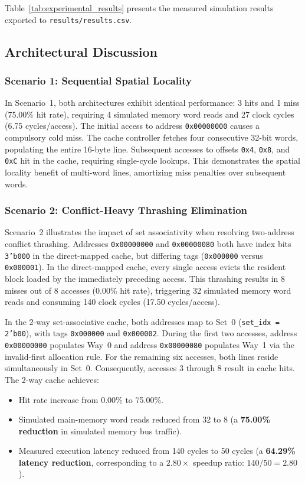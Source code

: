 \documentclass[conference]{IEEEtran}
\begin{document}
Table~\ref{tab:experimental_results} presents the measured simulation results exported to \texttt{results/results.csv}.

\subsection{Architectural Discussion}

\subsubsection{Scenario 1: Sequential Spatial Locality}
In Scenario~1, both architectures exhibit identical performance: 3 hits and 1 miss (75.00\% hit rate), requiring 4 simulated memory word reads and 27 clock cycles (6.75 cycles/access). The initial access to address \texttt{0x00000000} causes a compulsory cold miss. The cache controller fetches four consecutive 32-bit words, populating the entire 16-byte line. Subsequent accesses to offsets \texttt{0x4}, \texttt{0x8}, and \texttt{0xC} hit in the cache, requiring single-cycle lookups. This demonstrates the spatial locality benefit of multi-word lines, amortizing miss penalties over subsequent words.

\subsubsection{Scenario 2: Conflict-Heavy Thrashing Elimination}
Scenario~2 illustrates the impact of set associativity when resolving two-address conflict thrashing. Addresses \texttt{0x00000000} and \texttt{0x00000080} both have index bits \texttt{3'b000} in the direct-mapped cache, but differing tags (\texttt{0x000000} versus \texttt{0x000001}). In the direct-mapped cache, every single access evicts the resident block loaded by the immediately preceding access. This thrashing results in 8 misses out of 8 accesses (0.00\% hit rate), triggering 32 simulated memory word reads and consuming 140 clock cycles (17.50 cycles/access).

In the 2-way set-associative cache, both addresses map to Set~0 (\texttt{set\_idx = 2'b00}), with tags \texttt{0x000000} and \texttt{0x000002}. During the first two accesses, address \texttt{0x00000000} populates Way~0 and address \texttt{0x00000080} populates Way~1 via the invalid-first allocation rule. For the remaining six accesses, both lines reside simultaneously in Set~0. Consequently, accesses 3 through 8 result in cache hits. The 2-way cache achieves:
\begin{itemize}
    \item Hit rate increase from 0.00\% to 75.00\%.
    \item Simulated main-memory word reads reduced from 32 to 8 (a \textbf{75.00\% reduction} in simulated memory bus traffic).
    \item Measured execution latency reduced from 140 cycles to 50 cycles (a \textbf{64.29\% latency reduction}, corresponding to a $\mathbf{2.80\times}$ speedup ratio: $140 / 50 = 2.80$).
\end{itemize}
\end{document}
